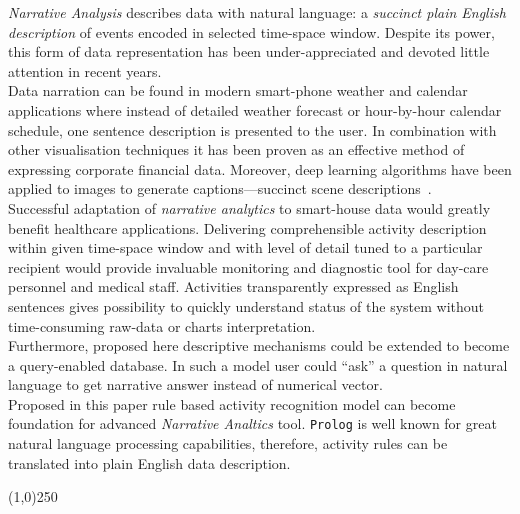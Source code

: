 \documentclass[10pt, a4paper, pdflatex, leqno, twoside, openright]{report}
\begin{document}
\emph{Narrative Analysis} describes data with natural language: a \emph{succinct plain English description} of events encoded in selected time-space window. Despite its power, this form of data representation has been under-appreciated and devoted little attention in recent years.\\
Data narration can be found in modern smart-phone weather and calendar applications where instead of detailed weather forecast or hour-by-hour calendar schedule, one sentence description is presented to the user. In combination with other visualisation techniques it has been proven as an effective method of expressing corporate financial data. Moreover, deep learning algorithms have been applied to images to generate captions---succinct scene descriptions~\citep{vinyals2014show}.\\

Successful adaptation of \emph{narrative analytics} to smart-house data would greatly benefit healthcare applications. Delivering comprehensible activity description within given time-space window and with level of detail tuned to a particular recipient would provide invaluable monitoring and diagnostic tool for day-care personnel and medical staff. Activities transparently expressed as English sentences gives possibility to quickly understand status of the system without time-consuming raw-data or charts interpretation.\\
Furthermore, proposed here descriptive mechanisms could be extended to become a query-enabled database. In such a model user could ``ask'' a question in natural language to get narrative answer instead of numerical vector.\\

Proposed in this paper rule based activity recognition model can become foundation for advanced \emph{Narrative Analtics} tool. \texttt{Prolog} is well known for great natural language processing capabilities, therefore, activity rules can be translated into plain English data description.

\begin{center}
\noindent \line(1,0){250}
\end{center}
\newpage
\thispagestyle{empty}%
\mbox{}

\cleardoublepage
{}
  {}
  
\cleardoublepage
{}
\end{document}
